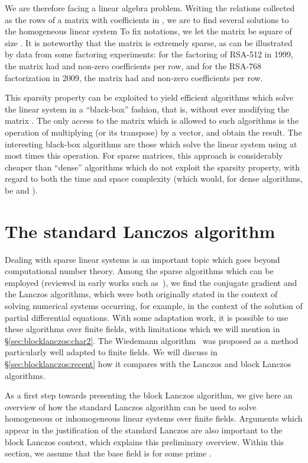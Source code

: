We are therefore facing a linear algebra problem. Writing the relations
collected as the rows of a matrix  with coefficients in , we are
to find several solutions to the homogeneous linear system  To
fix notations, we let the matrix  be square of size . It is
noteworthy that the matrix  is extremely sparse, as can be illustrated
by data from some factoring experiments: for the factoring of RSA-512 in
1999, the matrix  had  and  non-zero
coefficients per row, and for the RSA-768 factorization in 2009, the
matrix  had  and  non-zero coefficients per
row.

This sparsity property can be exploited to yield efficient algorithms
which solve the linear system in a ``black-box'' fashion, that is,
without ever modifying the matrix . The only access to the matrix 
which is allowed to such algorithms is the operation of multiplying 
(or its transpose) by a vector, and obtain the result. The interesting
black-box algorithms are those which solve the linear system using at
most  times this operation. For sparse matrices, this approach is
considerably cheaper than ``dense'' algorithms which do not exploit the
sparsity property, with regard to both the time and space complexity
(which would, for dense algorithms, be  and ).

\section{The standard Lanczos algorithm}
\label{sec:blocklanczos:lanczos}

Dealing with sparse linear systems is an important topic which goes
beyond computational number theory.  Among the sparse algorithms which
can be employed (reviewed in early works such as~\cite{C:LaMOdl90a}), we
find the conjugate gradient and the Lanczos algorithms, which were both
originally stated in the context of solving numerical systems occurring,
for example, in the context of the solution of partial differential
equations. With some adaptation work, it is possible to use these
algorithms over finite fields, with limitations which we will
mention in §\ref{sec:blocklanczos:char2}.
The Wiedemann algorithm~\cite{Wiedemann86} was proposed as a
method particularly well adapted to finite fields. We will discuss in
§\ref{sec:blocklanczos:recent} how it
compares with the Lanczos and block Lanczos algorithms.

As a first step towards presenting the block Lanczos algorithm, we give
here an overview of how the standard Lanczos algorithm can be used to
solve homogeneous or inhomogeneous linear systems over finite fields.
Arguments which appear in the justification of the standard Lanczos are
also important to the block Lanczos context, which explains this
preliminary overview.  Within this section, we assume that the base field
is  for some prime .


